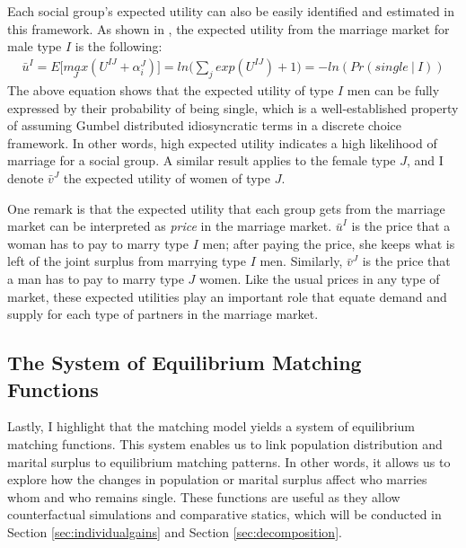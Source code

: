 Each social group's expected utility can also be easily identified and estimated in this framework. As shown in \cite{ChooSiow_2006_WhoMarriesWhomandWhy}, the expected utility from the marriage market for male type $I$ is the following:  
\begin{align}
	\bar{u}^I = E \Big[ \underset{J}{max} (U^{IJ} + \alpha^{J}_i) \Big] = ln \Big( \sum_j exp(U^{IJ}) + 1 \Big) = - ln(Pr(single \: | \: I)) \label{eq:EU}
\end{align}
The above equation shows that the expected utility of type $I$ men can be fully expressed by their probability of being single, which is a well-established property of assuming Gumbel distributed idiosyncratic terms in a discrete choice framework. In other words, high expected utility indicates a high likelihood of marriage for a social group. A similar result applies to the female type $J$, and I denote $\bar{v}^J$ the expected utility of women of type $J$. 

One remark is that the expected utility that each group gets from the marriage market can be interpreted as \textit{price} in the marriage market. $\bar{u}^I$ is the price that a woman has to pay to marry type $I$ men; after paying the price, she keeps what is left of the joint surplus from marrying type $I$ men. Similarly, $\bar{v}^J$ is the price that a man has to pay to marry type $J$ women. Like the usual prices in any type of market, these expected utilities play an important role that equate demand and supply for each type of partners in the marriage market. 

\subsection{The System of Equilibrium Matching Functions} \label{sec:systemfunctions}

Lastly, I highlight that the matching model yields a system of equilibrium matching functions. This system enables us to link population distribution and marital surplus to equilibrium matching patterns. In other words, it allows us to explore how the changes in population or marital surplus affect who marries whom and who remains single. These functions are useful as they allow counterfactual simulations and comparative statics, which will be conducted in Section \ref{sec:individualgains} and Section \ref{sec:decomposition}.

